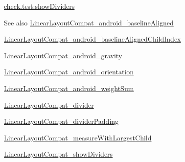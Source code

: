 {\ttfamily \hyperlink{classcheck_1_1test_1_1_r_1_1styleable_a71cd3612e1f50bfb49a67c1415778854}{check.\+test\+:show\+Dividers}}

\begin{DoxySeeAlso}{See also}
\hyperlink{classcheck_1_1test_1_1_r_1_1styleable_a67d8b5abe1097b46cea7bee93c465465}{Linear\+Layout\+Compat\+\_\+android\+\_\+baseline\+Aligned} 

\hyperlink{classcheck_1_1test_1_1_r_1_1styleable_a856d64f5e68d12a9b3a5daaacfa57e7b}{Linear\+Layout\+Compat\+\_\+android\+\_\+baseline\+Aligned\+Child\+Index} 

\hyperlink{classcheck_1_1test_1_1_r_1_1styleable_abe8ac977e2400616ce150828d8ec6a26}{Linear\+Layout\+Compat\+\_\+android\+\_\+gravity} 

\hyperlink{classcheck_1_1test_1_1_r_1_1styleable_a7888ca0cf0cdae867cd8a4826d080062}{Linear\+Layout\+Compat\+\_\+android\+\_\+orientation} 

\hyperlink{classcheck_1_1test_1_1_r_1_1styleable_ae245bae0548f5ad66ca9cf0a1cdb45b4}{Linear\+Layout\+Compat\+\_\+android\+\_\+weight\+Sum} 

\hyperlink{classcheck_1_1test_1_1_r_1_1styleable_ac11ca4a97787af8e1f1d162edcc0c436}{Linear\+Layout\+Compat\+\_\+divider} 

\hyperlink{classcheck_1_1test_1_1_r_1_1styleable_afdc801825abf8606d597921106733dda}{Linear\+Layout\+Compat\+\_\+divider\+Padding} 

\hyperlink{classcheck_1_1test_1_1_r_1_1styleable_a68068887a622f9abc4411ad0205c6676}{Linear\+Layout\+Compat\+\_\+measure\+With\+Largest\+Child} 

\hyperlink{classcheck_1_1test_1_1_r_1_1styleable_a71cd3612e1f50bfb49a67c1415778854}{Linear\+Layout\+Compat\+\_\+show\+Dividers} 
\end{DoxySeeAlso}
\hypertarget{classcheck_1_1test_1_1_r_1_1styleable_a67d8b5abe1097b46cea7bee93c465465}{}
